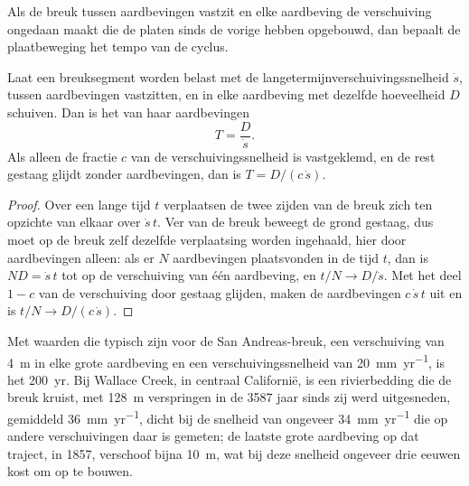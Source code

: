 Als de breuk tussen aardbevingen vastzit en elke aardbeving de verschuiving ongedaan maakt die de platen sinds de vorige hebben opgebouwd, dan bepaalt de plaatbeweging het tempo van de cyclus.

\begin{proposition}\label{prop:b1:earthquake-source:recurrence}
Laat een breuksegment worden belast met de langetermijnverschuivingssnelheid $\dot s$, tussen aardbevingen vastzitten, en in elke aardbeving met dezelfde hoeveelheid $D$ schuiven. Dan is het  van haar aardbevingen
\[
  T = \frac{D}{\dot s} .
\]
Als alleen de fractie $c$ van de verschuivingssnelheid is vastgeklemd, en de rest gestaag glijdt zonder aardbevingen, dan is $T = D/(c\,\dot s)$.
\end{proposition}

\begin{proof}
Over een lange tijd $t$ verplaatsen de twee zijden van de breuk zich ten opzichte van elkaar over $\dot s\,t$. Ver van de breuk beweegt de grond gestaag, dus moet op de breuk zelf dezelfde verplaatsing worden ingehaald, hier door aardbevingen alleen: als er $N$ aardbevingen plaatsvonden in de tijd $t$, dan is $N D = \dot s\,t$ tot op de verschuiving van één aardbeving, en $t/N \to D/\dot s$. Met het deel $1-c$ van de verschuiving door gestaag glijden, maken de aardbevingen $c\,\dot s\,t$ uit en is $t/N \to D/(c\,\dot s)$.
\end{proof}

Met waarden die typisch zijn voor de San Andreas-breuk, een verschuiving van \qty{4}{m} in elke grote aardbeving en een verschuivingssnelheid van \qty{20}{mm.yr^{-1}}, is het  \qty{200}{yr}. Bij Wallace Creek, in centraal Californië, is een rivierbedding die de breuk kruist, met \qty{128}{m} verspringen in de \num{3587} jaar sinds zij werd uitgesneden, gemiddeld \qty{36}{mm.yr^{-1}}, dicht bij de snelheid van ongeveer \qty{34}{mm.yr^{-1}} die op andere verschuivingen daar is gemeten; de laatste grote aardbeving op dat traject, in 1857, verschoof bijna \qty{10}{m}, wat bij deze snelheid ongeveer drie eeuwen kost om op te bouwen.


